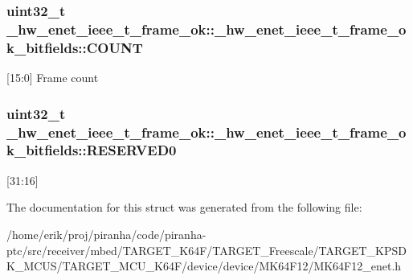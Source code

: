 \subsubsection[{\texorpdfstring{C\+O\+U\+NT}{COUNT}}]{\setlength{\rightskip}{0pt plus 5cm}uint32\+\_\+t \+\_\+hw\+\_\+enet\+\_\+ieee\+\_\+t\+\_\+frame\+\_\+ok\+::\+\_\+hw\+\_\+enet\+\_\+ieee\+\_\+t\+\_\+frame\+\_\+ok\+\_\+bitfields\+::\+C\+O\+U\+NT}\hypertarget{struct__hw__enet__ieee__t__frame__ok_1_1__hw__enet__ieee__t__frame__ok__bitfields_ac0eae4fbbd08f25cfaad682a4beb7c93}{}\label{struct__hw__enet__ieee__t__frame__ok_1_1__hw__enet__ieee__t__frame__ok__bitfields_ac0eae4fbbd08f25cfaad682a4beb7c93}
\mbox{[}15\+:0\mbox{]} Frame count 
\subsubsection[{\texorpdfstring{R\+E\+S\+E\+R\+V\+E\+D0}{RESERVED0}}]{\setlength{\rightskip}{0pt plus 5cm}uint32\+\_\+t \+\_\+hw\+\_\+enet\+\_\+ieee\+\_\+t\+\_\+frame\+\_\+ok\+::\+\_\+hw\+\_\+enet\+\_\+ieee\+\_\+t\+\_\+frame\+\_\+ok\+\_\+bitfields\+::\+R\+E\+S\+E\+R\+V\+E\+D0}\hypertarget{struct__hw__enet__ieee__t__frame__ok_1_1__hw__enet__ieee__t__frame__ok__bitfields_afe33d571d5a65711e3349b1f66cd3bec}{}\label{struct__hw__enet__ieee__t__frame__ok_1_1__hw__enet__ieee__t__frame__ok__bitfields_afe33d571d5a65711e3349b1f66cd3bec}
\mbox{[}31\+:16\mbox{]} 

The documentation for this struct was generated from the following file\+:\begin{DoxyCompactItemize}
\item 
/home/erik/proj/piranha/code/piranha-\/ptc/src/receiver/mbed/\+T\+A\+R\+G\+E\+T\+\_\+\+K64\+F/\+T\+A\+R\+G\+E\+T\+\_\+\+Freescale/\+T\+A\+R\+G\+E\+T\+\_\+\+K\+P\+S\+D\+K\+\_\+\+M\+C\+U\+S/\+T\+A\+R\+G\+E\+T\+\_\+\+M\+C\+U\+\_\+\+K64\+F/device/device/\+M\+K64\+F12/M\+K64\+F12\+\_\+enet.\+h\end{DoxyCompactItemize}
